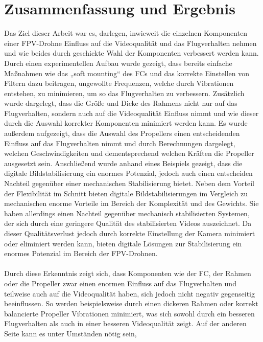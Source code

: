 
\section[Zusammenfassung und Ergebnis]{Zusammenfassung und Ergebnis}
Das Ziel dieser Arbeit war es, darlegen, inwieweit die einzelnen Komponenten einer FPV-Drohne
Einfluss auf die Videoqualität und das Flugverhalten nehmen und wie beides durch geschickte Wahl
der Komponenten verbessert werden kann. Durch einen experimentellen Aufbau wurde gezeigt, dass
bereits einfache Maßnahmen wie das „soft mounting“ des FCs und das korrekte Einstellen von Filtern
dazu beitragen, ungewollte Frequenzen, welche durch Vibrationen entstehen, zu minimieren, um so
das Flugverhalten zu verbessern. Zusätzlich wurde dargelegt, dass die Größe und Dicke des Rahmens
nicht nur auf das Flugverhalten, sondern auch auf die Videoqualität Einfluss nimmt und wie dieser
durch die Auswahl korrekter Komponenten minimiert werden kann. Es wurde außerdem aufgezeigt, dass
die Auswahl des Propellers einen entscheidenden Einfluss auf das Flugverhalten nimmt und durch
Berechnungen dargelegt, welchen Geschwindigkeiten und dementsprechend welchen Kräften die Propeller
ausgesetzt sein. Anschließend wurde anhand eines Beispiels gezeigt, dass die digitale
Bildstabilisierung ein enormes Potenzial, jedoch auch einen entscheiden Nachteil gegenüber einer
mechanischen Stabilisierung bietet. Neben dem Vorteil der Flexibilität im Schnitt bieten digitale
Bildstabilisierungen im Vergleich zu mechanischen enorme Vorteile im Bereich der Komplexität und
des Gewichts. Sie haben allerdings einen Nachteil gegenüber mechanisch stabilisierten Systemen,
der sich durch eine geringere Qualität des stabilisierten Videos auszeichnet. Da dieser Qualitätsverlust
jedoch durch korrekte Einstellung der Kamera minimiert oder eliminiert werden kann, bieten digitale
Lösungen zur Stabilisierung ein enormes Potenzial im Bereich der FPV-Drohnen. \\
\\
Durch diese Erkenntnis zeigt sich, dass Komponenten wie der FC, der Rahmen oder die Propeller zwar
einen enormen Einfluss auf das Flugverhalten und teilweise auch auf die Videoqualität haben, sich
jedoch nicht negativ gegenseitig beeinflussen. So werden beispielsweise durch einen dickeren Rahmen
oder korrekt balancierte Propeller Vibrationen minimiert, was sich sowohl durch ein besseren Flugverhalten
als auch in einer besseren Videoqualität zeigt. Auf der anderen Seite kann es unter Umständen nötig sein,
